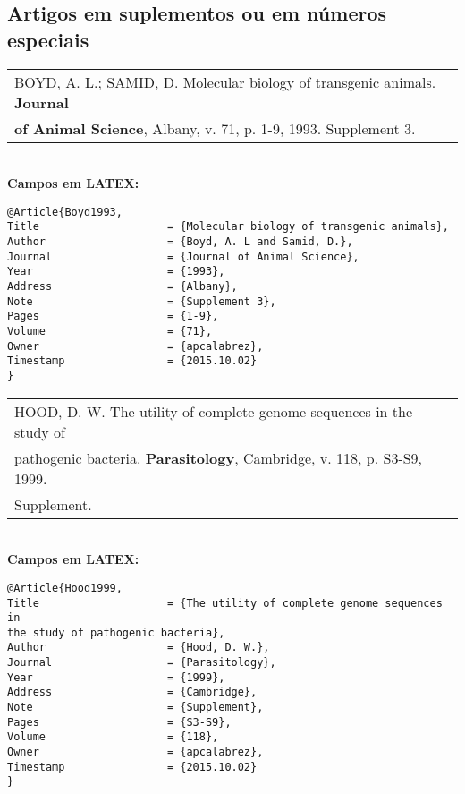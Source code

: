 \subsection{Artigos em suplementos ou em n\'umeros especiais}

\begin{tabular}{|l|c|} \hline
	BOYD, A. L.; SAMID, D. Molecular biology of transgenic animals. \textbf{Journal } \\ \textbf{of Animal Science}, Albany, v. 71, p. 1-9, 1993. Supplement 3. 
	\\\hline
\end{tabular} \\

\textbf{Campos em LATEX:} 

\begin{verbatim}
@Article{Boyd1993,
Title                    = {Molecular biology of transgenic animals},
Author                   = {Boyd, A. L and Samid, D.},
Journal                  = {Journal of Animal Science},
Year                     = {1993},
Address                  = {Albany},
Note                     = {Supplement 3},
Pages                    = {1-9},
Volume                   = {71},
Owner                    = {apcalabrez},
Timestamp                = {2015.10.02}
}
\end{verbatim}

\begin{tabular}{|l|c|} \hline
	HOOD, D. W. The utility of complete genome sequences in the study of \\pathogenic bacteria. \textbf{Parasitology}, Cambridge, v. 118, p. S3-S9, 1999. \\Supplement. \\\hline
\end{tabular} \\

\textbf{Campos em LATEX:} 

\begin{verbatim}
@Article{Hood1999,
Title                    = {The utility of complete genome sequences in 
the study of pathogenic bacteria},
Author                   = {Hood, D. W.},
Journal                  = {Parasitology},
Year                     = {1999},
Address                  = {Cambridge},
Note                     = {Supplement},
Pages                    = {S3-S9},
Volume                   = {118},
Owner                    = {apcalabrez},
Timestamp                = {2015.10.02}
}
\end{verbatim}

